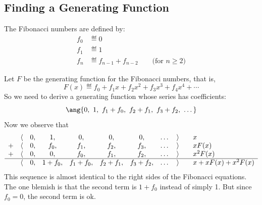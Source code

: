 \documentclass[handout]{mcs}
\begin{document}

\subsection{Finding a Generating Function}
The Fibonacci numbers are defined by:
\begin{align*}
f_0 & \eqdef 0 \\
f_1 & \eqdef 1 \\
f_n & \eqdef f_{n-1} + f_{n-2} \qquad \text{(for $n \geq 2$)}
\end{align*}

Let $F$ be the generating function for the Fibonacci numbers,
that is,
\[
F(x) \eqdef f_0 + f_1 x + f_2 x^2 + f_3 x^3 + f_4 x^4 + \cdots
\]
So we need to derive a generating function whose series has
coefficients:
\[
\ang{0,\ 1,\ f_1 + f_0,\ f_2 + f_1,\ f_3 + f_2,\ \dots}
\]
Now we observe that
\[
\begin{array}{ccccccccccl}
  & \langle & 0, & 1, & 0, & 0, & 0, & \dots & \rangle
    &     & x \\
+ & \langle & 0, & f_0, & f_1, & f_2, & f_3, & \dots & \rangle
    &     & x F(x) \\
+ & \langle & 0, & 0, & f_0, & f_1, & f_2, & \dots & \rangle
    &     & x^2 F(x) \\ \hline
  & \langle & 0, & 1 + f_0, & f_1 + f_0, & f_2 + f_1, & f_3 + f_2, & \dots & \rangle
    &     & x + x F(x) + x^2 F(x) \\
\end{array}
\]
%
This sequence is almost identical to the right sides of the
Fibonacci equations.  The one blemish is that the second term is
$1 + f_0$ instead of simply 1.  But since $f_0 = 0$, the second
term is ok.
\end{document}
